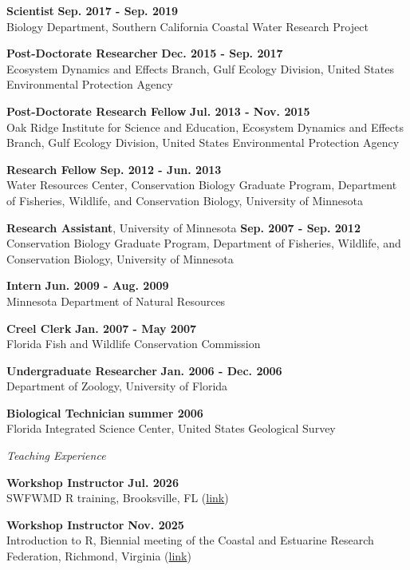 \documentclass[letterpaper,12pt]{article}
\newcommand{\sectitle}[1]{\vspace{\baselineskip} \centerline{\large{\textit{#1}}}}
\begin{document}
{\bf Scientist} \hfill {\bf Sep. 2017 - Sep. 2019}\\
Biology Department, Southern California Coastal Water Research Project

{\bf Post-Doctorate Researcher} \hfill {\bf Dec. 2015 - Sep. 2017}\\
Ecosystem Dynamics and Effects Branch, Gulf Ecology Division, United States Environmental Protection Agency

{\bf Post-Doctorate Research Fellow} \hfill {\bf Jul. 2013 - Nov. 2015}\\
Oak Ridge Institute for Science and Education, Ecosystem Dynamics and Effects Branch, Gulf Ecology Division, United States Environmental Protection Agency

{\bf Research Fellow} \hfill {\bf Sep. 2012 - Jun. 2013} \\
Water Resources Center, Conservation Biology Graduate Program, Department of Fisheries, Wildlife, and Conservation Biology, University of Minnesota

{\bf Research Assistant}, University of Minnesota \hfill {\bf Sep. 2007 - Sep. 2012} \\
Conservation Biology Graduate Program, Department of Fisheries, Wildlife, and Conservation Biology, University of Minnesota

{\bf Intern} \hfill {\bf Jun. 2009 - Aug. 2009} \\
Minnesota Department of Natural Resources

{\bf Creel Clerk} \hfill {\bf Jan. 2007 - May 2007} \\
Florida Fish and Wildlife Conservation Commission

{\bf Undergraduate Researcher} \hfill {\bf Jan. 2006 - Dec. 2006} \\
Department of Zoology, University of Florida

{\bf Biological Technician} \hfill {\bf summer 2006} \\
Florida Integrated Science Center, United States Geological Survey

\sectitle{Teaching Experience}

{\bf Workshop Instructor} \hfill {\bf Jul. 2026}\\
SWFWMD R training, Brooksville, FL ({\footnotesize\href{https://tbep-tech.github.io/swfwmd-r-training}{link}})

{\bf Workshop Instructor} \hfill {\bf Nov. 2025}\\
Introduction to R, Biennial meeting of the Coastal and Estuarine Research Federation, Richmond, Virginia ({\footnotesize\href{https://tbep-tech.github.io/cerf-r-workshop/}{link}})
\end{document}

